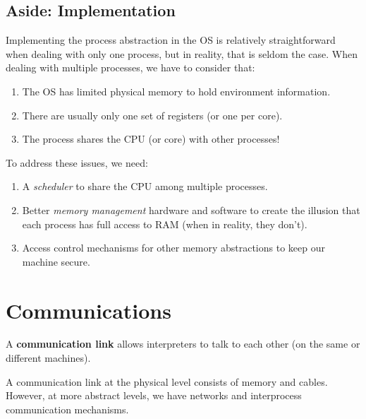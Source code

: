 \documentclass{report}
\begin{document}
\subsection*{Aside: Implementation}
Implementing the process abstraction in the OS is relatively straightforward when dealing with only
one process, but in reality, that is seldom the case. When dealing with multiple processes, we have
to consider that:
\begin{enumerate}[label=\textit{(\roman*)}]
\item The OS has limited physical memory to hold environment information.
\item There are usually only one set of registers (or one per core).
\item The process shares the CPU (or core) with other processes!
\end{enumerate}
To address these issues, we need:
\begin{enumerate}[label=\textit{(\roman*)}]
\item A \textit{scheduler} to share the CPU among multiple processes.
\item Better \textit{memory management} hardware and software to create the illusion that
  each process has full access to RAM (when in reality, they don't).
\item Access control mechanisms for other memory abstractions to keep our machine secure.
\end{enumerate}

\section{Communications}

\begin{tcolorbox}[title=Definition: Communication Link]
  A \textbf{communication link} allows interpreters to talk to each other (on the same or different machines).
\end{tcolorbox}

\begin{tcolorbox}[colback=violet!5!white,colframe=violet,title=Abstraction: Communication Links] 
  A communication link at the physical level consists of memory and cables. However, at more
  abstract levels, we have networks and interprocess communication mechanisms.
\end{tcolorbox}
\end{document}
